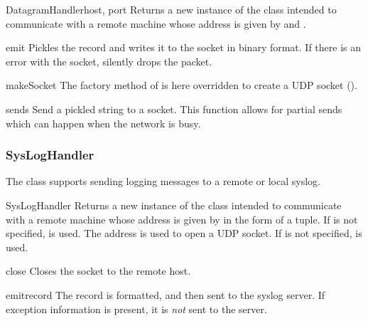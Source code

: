 \begin{classdesc}{DatagramHandler}{host, port}
Returns a new instance of the  class intended to
communicate with a remote machine whose address is given by 
and .
\end{classdesc}

\begin{methoddesc}{emit}{}
Pickles the record and writes it to the socket in binary format.
If there is an error with the socket, silently drops the packet.
\end{methoddesc}

\begin{methoddesc}{makeSocket}{}
The factory method of  is here overridden to create
a UDP socket ().
\end{methoddesc}

\begin{methoddesc}{send}{s}
Send a pickled string to a socket. This function allows for
partial sends which can happen when the network is busy.
\end{methoddesc}

\subsubsection{SysLogHandler}

The  class supports sending logging messages to a
remote or local \UNIX{} syslog.

\begin{classdesc}{SysLogHandler}{}
Returns a new instance of the  class intended to
communicate with a remote \UNIX{} machine whose address is given by
 in the form of a 
tuple.  If  is not specified,  is
used.  The address is used to open a UDP socket.  If  is
not specified,  is used.
\end{classdesc}

\begin{methoddesc}{close}{}
Closes the socket to the remote host.
\end{methoddesc}

\begin{methoddesc}{emit}{record}
The record is formatted, and then sent to the syslog server. If
exception information is present, it is \emph{not} sent to the server.
\end{methoddesc}

